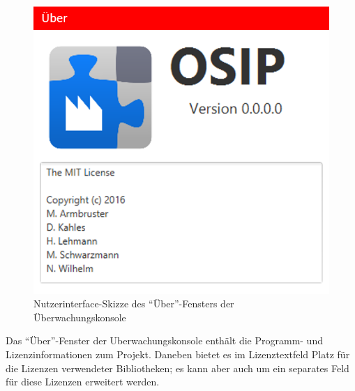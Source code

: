 \documentclass[parskip=full]{scrartcl}
\begin{document}
\begin{figure}[H]
	\centering
	\includegraphics[scale=0.5]{media/ui-client/ui-uw-uber.png}
	\caption{Nutzerinterface-Skizze des "`Über"'-Fensters der Überwachungskonsole}
\end{figure}
Das "`Über"'-Fenster der \gls{Uberwachungskonsole} enthält die Programm- und Lizenzinformationen zum Projekt. Daneben bietet es im Lizenztextfeld Platz für die Lizenzen verwendeter Bibliotheken; es kann aber auch um ein separates Feld für diese Lizenzen erweitert werden.

\pagebreak
\printglossaries

\pagebreak
{}
{}
\listoffigures
\end{document}
